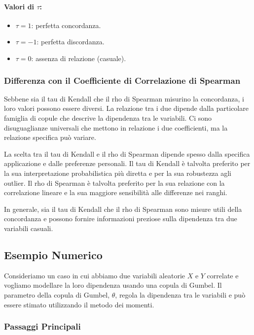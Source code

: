 \documentclass[%
	corpo=11pt,
    twoside,
    stile=classica,
    oldstyle,
    tipotesi=custom,
    greek,
    evenboxes,
]{toptesi}
\begin{document}
\paragraph{Valori di \( \tau \):}
\begin{itemize}
	\item \( \tau = 1 \): perfetta concordanza.
	\item \( \tau = -1 \): perfetta discordanza.
	\item \( \tau = 0 \): assenza di relazione (casuale).
\end{itemize}

\subsubsection{Differenza con il Coefficiente di Correlazione di Spearman}

Sebbene sia il tau di Kendall che il rho di Spearman misurino la concordanza, i loro valori possono essere diversi. La relazione tra i due dipende dalla particolare famiglia di copule che descrive la dipendenza tra le variabili. Ci sono disuguaglianze universali che mettono in relazione i due coefficienti, ma la relazione specifica può variare.

La scelta tra il tau di Kendall e il rho di Spearman dipende spesso dalla specifica applicazione e dalle preferenze personali. Il tau di Kendall è talvolta preferito per la sua interpretazione probabilistica più diretta e per la sua robustezza agli outlier. Il rho di Spearman è talvolta preferito per la sua relazione con la correlazione lineare e la sua maggiore sensibilità alle differenze nei ranghi.

In generale, sia il tau di Kendall che il rho di Spearman sono misure utili della concordanza e possono fornire informazioni preziose sulla dipendenza tra due variabili casuali.

\subsection{Esempio Numerico}

Consideriamo un caso in cui abbiamo due variabili aleatorie \( X \) e \( Y \) correlate e vogliamo modellare la loro dipendenza usando una copula di Gumbel. Il parametro della copula di Gumbel, \( \theta \), regola la dipendenza tra le variabili e può essere stimato utilizzando il metodo dei momenti.

\subsubsection{Passaggi Principali}
\end{document}

